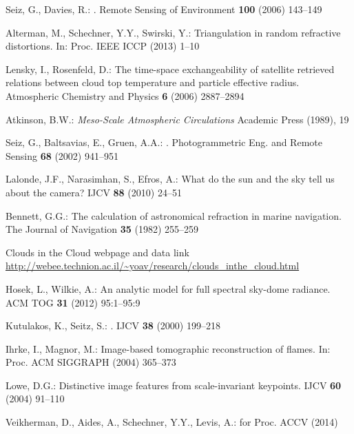 \documentclass[runningheads]{llncs}
\begin{document}
\begin{thebibliography}{10}
Seiz, G., Davies, R.:
.
\newblock Remote Sensing of Environment \textbf{100} (2006)  143--149

Alterman, M., Schechner, Y.Y., Swirski, Y.:
\newblock Triangulation in random refractive distortions.
\newblock In: Proc. IEEE ICCP  (2013)  1--10

Lensky, I., Rosenfeld, D.:
\newblock The time-space exchangeability of satellite retrieved relations
  between cloud top temperature and particle effective radius.
\newblock Atmospheric Chemistry and Physics \textbf{6} (2006)  2887--2894

Atkinson, B.W.:
{\em Meso-Scale Atmospheric Circulations}
\newblock Academic Press (1989), 19

Seiz, G., Baltsavias, E., Gruen, A.A.:
.
\newblock Photogrammetric Eng. and Remote Sensing \textbf{68} (2002)  941--951

Lalonde, J.F., Narasimhan, S., Efros, A.:
\newblock What do the sun and the sky tell us about the camera?
\newblock IJCV \textbf{88} (2010)  24--51

Bennett, G.G.:
\newblock The calculation of astronomical refraction in marine navigation.
\newblock The Journal of Navigation \textbf{35} (1982)  255--259

Clouds in the Cloud webpage and data link\\
\url{http://webee.technion.ac.il/~yoav/research/clouds_inthe_cloud.html}


Hosek, L., Wilkie, A.:
\newblock An analytic model for full spectral sky-dome radiance.
\newblock ACM TOG \textbf{31} (2012)  95:1--95:9

Kutulakos, K., Seitz, S.:
.
\newblock IJCV \textbf{38} (2000)  199--218

Ihrke, I., Magnor, M.:
\newblock Image-based tomographic reconstruction of flames.
\newblock In: Proc. ACM SIGGRAPH  (2004)  365--373

Lowe, D.G.:
\newblock Distinctive image features from scale-invariant keypoints.
\newblock IJCV \textbf{60} (2004)  91--110

Veikherman, D., Aides, A., Schechner, Y.Y., Levis, A.:
\newblock for Proc. ACCV (2014)


\end{thebibliography}
\end{document}
